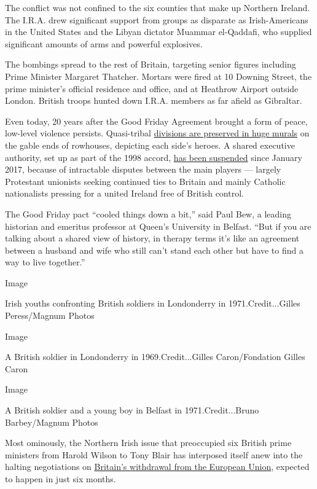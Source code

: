 The conflict was not confined to the six counties that make up Northern
Ireland. The I.R.A. drew significant support from groups as disparate as
Irish-Americans in the United States and the Libyan dictator Muammar
el-Qaddafi, who supplied significant amounts of arms and powerful
explosives.

The bombings spread to the rest of Britain, targeting senior figures
including Prime Minister Margaret Thatcher. Mortars were fired at 10
Downing Street, the prime minister's official residence and office, and
at Heathrow Airport outside London. British troops hunted down I.R.A.
members as far afield as Gibraltar.

Even today, 20 years after the Good Friday Agreement brought a form of
peace, low-level violence persists. Quasi-tribal
\href{https://www.nytimes.com/2000/08/12/world/belfast-journal-murals-of-troubles-draw-passions-and-tourists.html}{divisions
are preserved in huge murals} on the gable ends of rowhouses, depicting
each side's heroes. A shared executive authority, set up as part of the
1998 accord,
\href{https://www.nytimes.com/2017/11/20/world/europe/northern-ireland-stormont-adams.html}{has
been suspended} since January 2017, because of intractable disputes
between the main players --- largely Protestant unionists seeking
continued ties to Britain and mainly Catholic nationalists pressing for
a united Ireland free of British control.

The Good Friday pact ``cooled things down a bit,'' said Paul Bew, a
leading historian and emeritus professor at Queen's University in
Belfast. ``But if you are talking about a shared view of history, in
therapy terms it's like an agreement between a husband and wife who
still can't stand each other but have to find a way to live together.''

Image

Irish youths confronting British soldiers in Londonderry in
1971.Credit...Gilles Peress/Magnum Photos

Image

A British soldier in Londonderry in 1969.Credit...Gilles Caron/Fondation
Gilles Caron

Image

A British soldier and a young boy in Belfast in 1971.Credit...Bruno
Barbey/Magnum Photos

Most ominously, the Northern Irish issue that preoccupied six British
prime ministers from Harold Wilson to Tony Blair has interposed itself
anew into the halting negotiations on
\href{https://www.nytimes.com/2017/08/05/world/europe/brexit-northern-ireland-ireland.html}{Britain's
withdrawal from the European Union}, expected to happen in just six
months.


